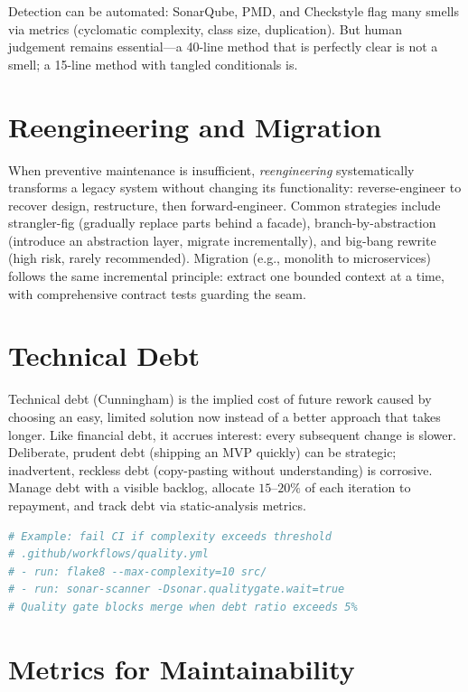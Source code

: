 Detection can be automated: SonarQube, PMD, and Checkstyle flag many smells via metrics (cyclomatic complexity, class size, duplication). But human judgement remains essential---a 40-line method that is perfectly clear is not a smell; a 15-line method with tangled conditionals is.


\section{Reengineering and Migration}

When preventive maintenance is insufficient, \emph{reengineering} systematically transforms a legacy system without changing its functionality: reverse-engineer to recover design, restructure, then forward-engineer. Common strategies include strangler-fig (gradually replace parts behind a facade), branch-by-abstraction (introduce an abstraction layer, migrate incrementally), and big-bang rewrite (high risk, rarely recommended). Migration (e.g., monolith to microservices) follows the same incremental principle: extract one bounded context at a time, with comprehensive contract tests guarding the seam.

\section{Technical Debt}

Technical debt (Cunningham) is the implied cost of future rework caused by choosing an easy, limited solution now instead of a better approach that takes longer. Like financial debt, it accrues interest: every subsequent change is slower. Deliberate, prudent debt (shipping an MVP quickly) can be strategic; inadvertent, reckless debt (copy-pasting without understanding) is corrosive. Manage debt with a visible backlog, allocate $15$--$20\%$ of each iteration to repayment, and track debt via static-analysis metrics.

\begin{lstlisting}[language=Python,caption={Automated smell detection in CI.}]
# Example: fail CI if complexity exceeds threshold
# .github/workflows/quality.yml
# - run: flake8 --max-complexity=10 src/
# - run: sonar-scanner -Dsonar.qualitygate.wait=true
# Quality gate blocks merge when debt ratio exceeds 5%
\end{lstlisting}



\section{Metrics for Maintainability}

